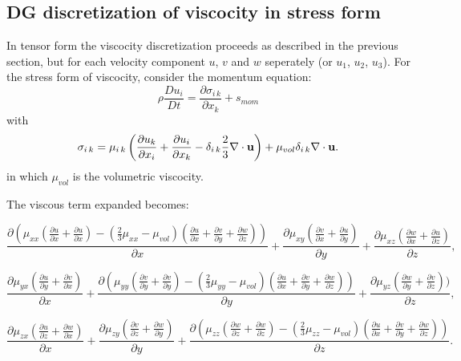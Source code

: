 \subsection{DG discretization of viscocity in stress form} 
In tensor form the viscocity discretization proceeds as described in the 
previous section, but for each velocity component $u$, $v$ and $w$ seperately (or $u_1$, $u_2$, $u_3$). 
For the stress form of viscocity, consider the momentum equation:
\begin{equation}
\rho \frac{ D u_i}{D t} = \frac{\partial \sigma_{i\,k}}{\partial x_k} +s_{mom}
\end{equation}
with 
\begin{equation}
\sigma_{i\, k}=\mu_{i\, k} \left( 
\frac{\partial u_k}{\partial x_i} +  \frac{\partial u_i}{\partial x_k} 
-\delta_{i\, k} \frac{2}{3} \nabla\cdot {\bf u} \right)  +  \mu_{vol} \delta_{i\, k} \nabla\cdot {\bf u}. 
\end{equation}
in which $\mu_{vol} $ is the volumetric viscocity.  

The viscous term expanded becomes:

\begin{equation}
\frac{\partial ( \mu_{xx}
(
\frac{\partial u}{\partial x}+\frac{\partial u}{\partial x})
-(\frac{2}{3}\mu_{xx}-\mu_{vol})(\frac{\partial u}{\partial x}+\frac{\partial v}{\partial y}+\frac{\partial w}{\partial z})
)}
{\partial x}
+
\frac{\partial \mu_{xy}
(
\frac{\partial v}{\partial x}+\frac{\partial u}{\partial y})
}
{\partial y}
+
\frac{\partial \mu_{xz}
(
\frac{\partial w}{\partial x}+\frac{\partial u}{\partial z})
}
{\partial z}, 
\label{visc-stress-u} 
\end{equation}



\begin{equation}
\frac{\partial \mu_{yx}
(
\frac{\partial u}{\partial y}+\frac{\partial v}{\partial x}
)}
{\partial x}
+
\frac{\partial (\mu_{yy}
(
\frac{\partial v}{\partial y}+\frac{\partial v}{\partial y})
-(\frac{2}{3}\mu_{yy}-\mu_{vol})(\frac{\partial u}{\partial x}+\frac{\partial v}{\partial y}+\frac{\partial w}{\partial z})
)}
{\partial y}
+
\frac{\partial \mu_{yz}
(
\frac{\partial w}{\partial y}+\frac{\partial v}{\partial z})
)}
{\partial z}, 
\label{visc-stress-v} 
\end{equation}



\begin{equation}
\frac{\partial \mu_{zx}
(
\frac{\partial u}{\partial z}+\frac{\partial w}{\partial x})
}
{\partial x}
+
\frac{\partial \mu_{zy}
(
\frac{\partial v}{\partial z}+\frac{\partial w}{\partial y})
}
{\partial y}
+
\frac{\partial ( \mu_{zz}
(
\frac{\partial w}{\partial z}+\frac{\partial w}{\partial z})
-(\frac{2}{3}\mu_{zz}-\mu_{vol})(\frac{\partial u}{\partial x}+\frac{\partial v}{\partial y}+\frac{\partial w}{\partial z})
)}
{\partial z}. 
\label{visc-stress-w} 
\end{equation}

